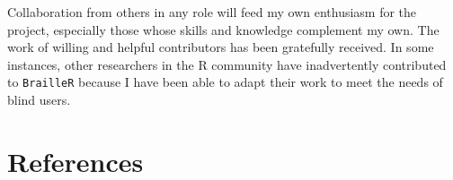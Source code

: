 \documentclass[
]{book}
\begin{document}
Collaboration from others in any role will feed my own enthusiasm for the project, especially those whose skills and knowledge complement my own.
The work of willing and helpful contributors has been gratefully received.
In some instances, other researchers in the R community have inadvertently contributed to \texttt{BrailleR} because I have been able to adapt their work to meet the needs of blind users.

\hypertarget{references}{%
\chapter{References}\label{references}}

  
\end{document}
